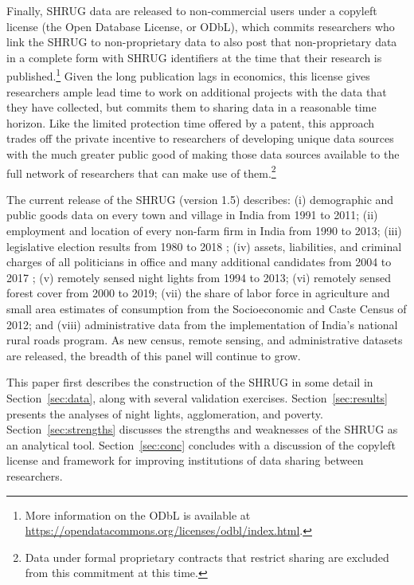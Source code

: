 \documentclass[12pt,letterpaper]{article}
\begin{document}
Finally, SHRUG data are released to non-commercial users under a
copyleft license (the Open Database License, or ODbL), which commits
researchers who link the SHRUG to non-proprietary data to also post
that non-proprietary data in a complete form with SHRUG identifiers at
the time that their research is published.\footnote{More information
  on the ODbL is available at
  \href{https://opendatacommons.org/licenses/odbl/index.html}{https://opendatacommons.org/licenses/odbl/index.html}.}
Given the long publication lags in economics, this license gives
researchers ample lead time to work on additional projects with the
data that they have collected, but commits them to sharing data in a
reasonable time horizon. Like the limited protection time offered by a
patent, this approach trades off the private incentive to researchers
of developing unique data sources with the much greater public good of
making those data sources available to the full network of researchers
that can make use of them.\footnote{Data under formal proprietary
  contracts that restrict sharing are excluded from this commitment at
  this time.}

The current release of the SHRUG (version 1.5) describes: (i)
demographic and public goods data on every town and village in India
from 1991 to 2011; (ii) employment and location of every non-farm firm
in India from 1990 to 2013; (iii) legislative election results from
1980 to 2018 \cite{Jensenius2017}; (iv) assets, liabilities, and
criminal charges of all politicians in office and many additional
candidates from 2004 to 2017 \cite{prakash2014}; (v) remotely sensed
night lights from 1994 to 2013; (vi) remotely sensed forest cover from
2000 to 2019; (vii) the share of labor force in agriculture and small
area estimates of consumption from the Socioeconomic and Caste Census
of 2012; and (viii) administrative data from the implementation of
India's national rural roads program. As new census, remote sensing,
and administrative datasets are released, the breadth of this panel
will continue to grow.

This paper first describes the construction of the SHRUG in some
detail in Section~\ref{sec:data}, along with several validation
exercises. Section~\ref{sec:results} presents the analyses of night
lights, agglomeration, and poverty. Section~\ref{sec:strengths}
discusses the strengths and weaknesses of the SHRUG as an analytical
tool. Section~\ref{sec:conc} concludes with a discussion of the
copyleft license and framework for improving institutions of data
sharing between researchers.
\end{document}
